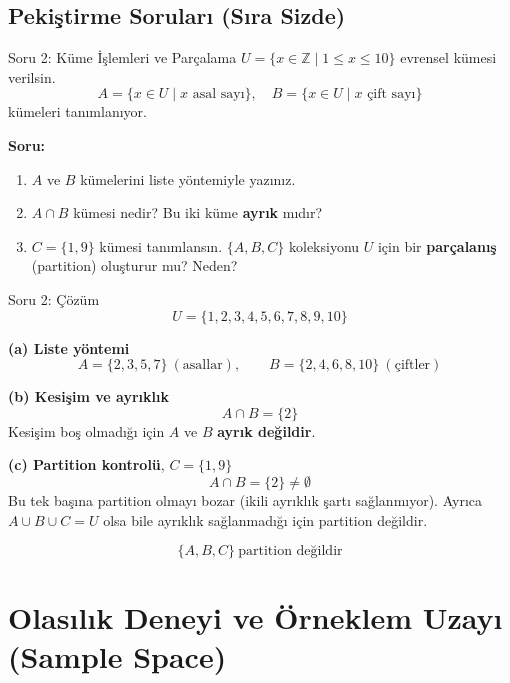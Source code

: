 \documentclass[light]{lutbeamer}
\begin{document}
\subsection{Pekiştirme Soruları (Sıra Sizde)}

\begin{frame}{Soru 2: Küme İşlemleri ve Parçalama}
    $U=\{x \in \mathbb{Z} \mid 1 \le x \le 10\}$ evrensel kümesi verilsin.
    \[
        A=\{x \in U \mid x \text{ asal sayı}\}, \quad
        B=\{x \in U \mid x \text{ çift sayı}\}
    \]
    kümeleri tanımlanıyor.
    
    \textbf{Soru:}
    \begin{enumerate}
        \item[(a)] $A$ ve $B$ kümelerini liste yöntemiyle yazınız.
        \item[(b)] $A \cap B$ kümesi nedir? Bu iki küme \textbf{ayrık} mıdır?
        \item[(c)] $C=\{1,9\}$ kümesi tanımlansın. $\{A,B,C\}$ koleksiyonu $U$ için bir \textbf{parçalanış} (partition) oluşturur mu? Neden?
    \end{enumerate}
\end{frame}

\begin{frame}{Soru 2: Çözüm}
    \color{red}
    \small
    \[
    U=\{1,2,3,4,5,6,7,8,9,10\}
    \]
    
    \textbf{(a) Liste yöntemi}
    \[
    A=\{2,3,5,7\}\ (\text{asallar}),\qquad
    B=\{2,4,6,8,10\}\ (\text{çiftler})
    \]
    
    \textbf{(b) Kesişim ve ayrıklık}
    \[
    A\cap B=\{2\}
    \]
    Kesişim boş olmadığı için $A$ ve $B$ \textbf{ayrık değildir}.
    
    \textbf{(c) Partition kontrolü}, $C=\{1,9\}$
    \[
    A\cap B=\{2\}\neq \emptyset
    \]
    Bu tek başına partition olmayı bozar (ikili ayrıklık şartı sağlanmıyor).
    Ayrıca $A\cup B\cup C=U$ olsa bile ayrıklık sağlanmadığı için partition değildir.
    
    \[
    \boxed{\{A,B,C\}\ \text{partition değildir}}
    \]
\end{frame}

\section{Olasılık Deneyi ve Örneklem Uzayı (Sample Space)}
\end{document}
